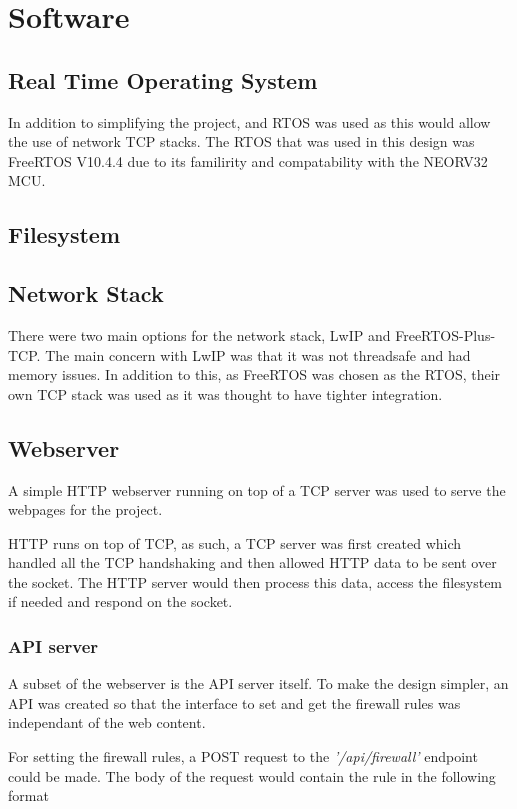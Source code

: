 \section{Software}



\subsection{Real Time Operating System}
In addition to simplifying the project, and RTOS was used as this would allow the use of network TCP stacks. The RTOS that was used in this design was FreeRTOS V10.4.4 due to its familirity and compatability with the NEORV32 MCU.

\subsection{Filesystem}

\subsection{Network Stack}
There were two main options for the network stack, LwIP and FreeRTOS-Plus-TCP. The main concern with LwIP was that it was not threadsafe and had memory issues. In addition to this, as FreeRTOS was chosen as the RTOS, their own TCP stack was used as it was thought to have tighter integration. 


\subsection{Webserver}
A simple HTTP webserver running on top of a TCP server was used to serve the webpages for the project. 

HTTP runs on top of TCP, as such, a TCP server was first created which handled all the TCP handshaking and then allowed HTTP data to be sent over the socket. The HTTP server would then process this data, access the filesystem if needed and respond on the socket. 


\subsubsection{API server}
A subset of the webserver is the API server itself. To make the design simpler, an API was created so that the interface to set and get the firewall rules was independant of the web content.

For setting the firewall rules, a POST request to the \textit{'/api/firewall'} endpoint could be made. The body of the request would contain the rule in the following format

